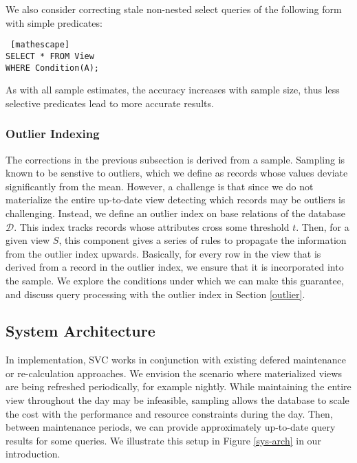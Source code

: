 We also consider correcting stale non-nested select queries of the following form with simple predicates:
\begin{lstlisting} [mathescape]
SELECT * FROM View 
WHERE Condition(A);
\end{lstlisting}
As with all sample estimates, the accuracy increases with sample size, thus less selective predicates lead to more accurate results. 

\subsubsection{Outlier Indexing}
The corrections in the previous subsection is derived from a sample.
Sampling is known to be senstive to outliers, which we define as records whose values deviate significantly from the mean.
However, a challenge is that since we do not materialize the entire up-to-date view detecting which records may be outliers is challenging.
Instead, we define an outlier index on base relations of the database $\mathcal{D}$.
This index tracks records whose attributes cross some threshold $t$.
Then, for a given view $S$, this component gives a series of rules to propagate the information from the outlier index upwards.
Basically, for every row in the view that is derived from a record in the outlier index, we ensure that it is incorporated into the sample.
We explore the conditions under which we can make this guarantee, and discuss query processing with the outlier index in Section \ref{outlier}.

\subsection{System Architecture}
In implementation, SVC works in conjunction with existing defered maintenance or re-calculation approaches.
We envision the scenario where materialized views are being refreshed periodically, for example nightly.
While maintaining the entire view throughout the day may be infeasible, sampling allows the database to scale the cost with the performance and resource constraints during the day.
Then, between maintenance periods, we can provide approximately up-to-date query results for some queries.
We illustrate this setup in Figure \ref{sys-arch} in our introduction.
 
